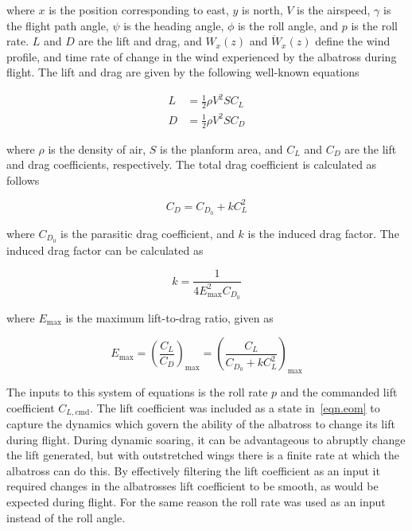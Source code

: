 \documentclass[11pt,letterpaper,onecolumn]{article}
\begin{document}
  where $x$ is the position corresponding to east, $y$ is north, $V$ is the airspeed, $\gamma$ is the flight path angle, $\psi$ is the heading angle, $\phi$ is the roll angle, and $p$ is the roll rate.
  $L$ and $D$ are the lift and drag, and $W_{x}(z)$ and $\dot{W}_{x}(z)$ define the wind profile, and time rate of change in the wind experienced by the albatross during flight.
  The lift and drag are given by the following well-known equations

  \begin{align}
    L &=\frac{1}{2}\rho V^{2}SC_{L} \\
    D &=\frac{1}{2}\rho V^{2}SC_{D}
  \end{align}

  where $\rho$ is the density of air, $S$ is the planform area, and $C_{L}$ and $C_{D}$ are the lift and drag coefficients, respectively.
  The total drag coefficient is calculated as follows

  \begin{equation}
    C_{D}=C_{D_{0}}+kC_{L}^{2}
  \end{equation}

  where $C_{D_{0}}$ is the parasitic drag coefficient, and $k$ is the induced drag factor.
  The induced drag factor can be calculated as

  \begin{equation}
    k=\frac{1}{4E_{\text{max}}^{2}C_{D_{0}}}
  \end{equation}

  where $E_{\text{max}}$ is the maximum lift-to-drag ratio, given as

  \begin{equation}
    E_{\text{max}}=\left(\frac{C_{L}}{C_{D}}\right)_{\text{max}}
    =\left(\frac{C_{L}}{C_{D_{0}}+kC_{L}^{2}}\right)_{\text{max}}
  \end{equation}

  The inputs to this system of equations is the roll rate $p$ and the commanded lift coefficient $C_{L,\text{cmd}}$.
  The lift coefficient was included as a state in~\eqref{eqn.eom} to capture the dynamics which govern the ability of the albatross to change its lift during flight.
  During dynamic soaring, it can be advantageous to abruptly change the lift generated, but with outstretched wings there is a finite rate at which the albatross can do this.
  By effectively filtering the lift coefficient as an input it required changes in the albatrosses lift coefficient to be smooth, as would be expected during flight.
  For the same reason the roll rate was used as an input instead of the roll angle.
\end{document}
